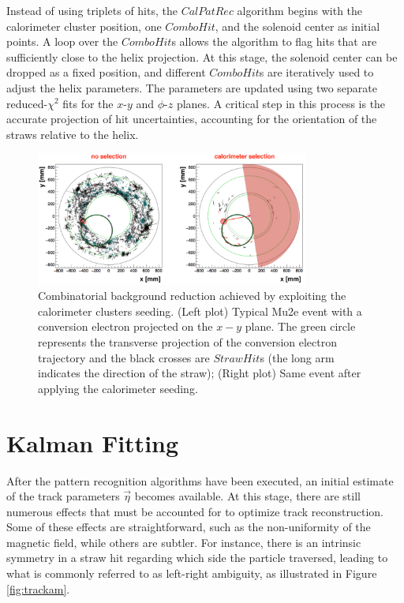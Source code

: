 Instead of using triplets of hits, the $CalPatRec$ algorithm begins with 
the calorimeter cluster position, one $ComboHit$, and the solenoid 
center as initial points. A loop over the $ComboHit$s allows the 
algorithm to flag hits that are sufficiently close to the helix projection. 
At this stage, the solenoid center can be dropped as a fixed position, and 
different $ComboHit$s are iteratively used to adjust the helix parameters. 
The parameters are updated using two separate reduced-$\chi^2$ fits for the 
$x$-$y$ and $\phi$-$z$ planes. A critical step in this process is the 
accurate projection of hit uncertainties, accounting for the orientation 
of the straws relative to the helix.


\begin{figure}[!h]
    \centering
    \includegraphics[width =0.8\textwidth]{figures/png/Screenshot_20240810_165014.png}
    \caption[Combinatorial background reduction achieved by exploiting the calorimeter 
    clusters seeding.]{Combinatorial background reduction achieved by exploiting the 
    calorimeter clusters seeding. (Left plot) Typical Mu2e event 
    with a conversion electron
    projected on the $x-y$ plane. The green circle represents 
    the transverse projection of the
    conversion electron trajectory and the black crosses are $StrawHit$s (the long arm 
    indicates the direction of the straw); (Right plot) Same event 
    after applying the calorimeter seeding.}
    \label{fig:combinatorial}
\end{figure}


\section{Kalman Fitting}
After the pattern recognition algorithms have been executed, 
an initial estimate of the track parameters $\vec{\eta}$ becomes 
available. At this stage, there are still numerous effects that 
must be accounted for to optimize track reconstruction. Some of 
these effects are straightforward, such as the non-uniformity of 
the magnetic field, while others are subtler. For instance, there 
is an intrinsic symmetry in a straw hit regarding which side the 
particle traversed, leading to what is commonly referred to as left-right 
ambiguity, as illustrated in Figure \ref{fig:trackam}.

